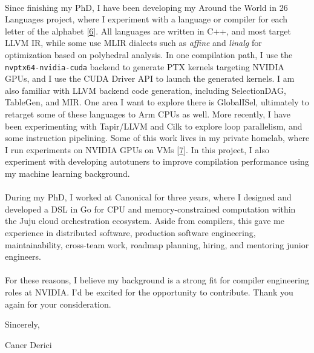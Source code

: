 \paragraph{} %
Since finishing my PhD, I have been developing my Around the World in 26 Languages project, where I experiment with a language or compiler for each letter of the alphabet [\href{\atwurl}{6}]. All languages are written in C++, and most target LLVM IR, while some use MLIR dialects such as \emph{affine} and \emph{linalg} for optimization based on polyhedral analysis. In one compilation path, I use the \texttt{nvptx64-nvidia-cuda} backend to generate PTX kernels targeting NVIDIA GPUs, and I use the CUDA Driver API to launch the generated kernels. I am also familiar with LLVM backend code generation, including SelectionDAG, TableGen, and MIR. One area I want to explore there is GlobalISel, ultimately to retarget some of these languages to Arm CPUs as well. More recently, I have been experimenting with Tapir/LLVM and Cilk to explore loop parallelism, and some instruction pipelining. Some of this work lives in my private homelab, where I run experiments on NVIDIA GPUs on VMs [\href{\homelaburl}{7}]. In this project, I also experiment with developing autotuners to improve compilation performance using my machine learning background.

\paragraph{} %
During my PhD, I worked at Canonical for three years, where I designed and developed a DSL in Go for CPU and memory-constrained computation within the Juju cloud orchestration ecosystem. Aside from compilers, this gave me experience in distributed software, production software engineering, maintainability, cross-team work, roadmap planning, hiring, and mentoring junior engineers.

\paragraph{} %
For these reasons, I believe my background is a strong fit for compiler engineering roles at NVIDIA. I’d be excited for the opportunity to contribute. Thank you again for your consideration.

\vspace{1.2em}

Sincerely,

Caner Derici

\vfill

